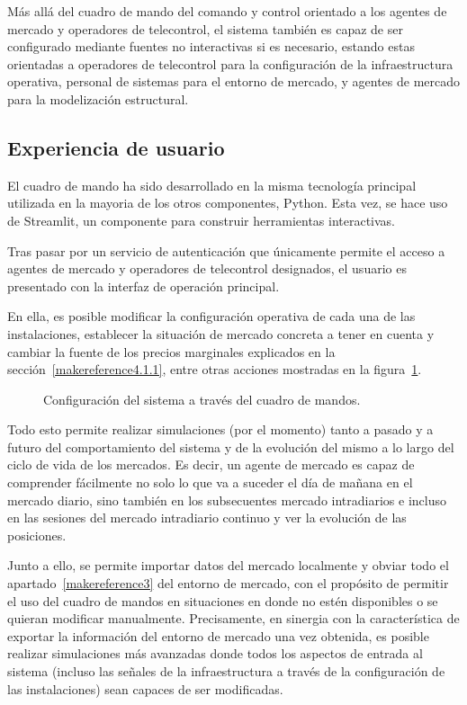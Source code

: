 Más allá del cuadro de mando del comando y control orientado a los agentes de mercado y operadores de telecontrol, el sistema también es capaz de ser configurado mediante fuentes no interactivas si es necesario, estando estas orientadas a operadores de telecontrol para la configuración de la infraestructura operativa, personal de sistemas para el entorno de mercado, y agentes de mercado para la modelización estructural.

\subsection{Experiencia de usuario}
\label{makereference6.2.1}

El cuadro de mando ha sido desarrollado en la misma tecnología principal utilizada en la mayoria de los otros componentes, Python. Esta vez, se hace uso de Streamlit, un componente para construir herramientas interactivas.

Tras pasar por un servicio de autenticación que únicamente permite el acceso a agentes de mercado y operadores de telecontrol designados, el usuario es presentado con la interfaz de operación principal.

En ella, es posible modificar la configuración operativa de cada una de las instalaciones, establecer la situación de mercado concreta a tener en cuenta y cambiar la fuente de los precios marginales explicados en la sección~\ref{makereference4.1.1}, entre otras acciones mostradas en la figura~\ref{fig:configuración-sistema}.

\begin{figure}
  \centering
  \caption{Configuración del sistema a través del cuadro de mandos.}
  \label{fig:configuración-sistema}
\end{figure}

Todo esto permite realizar simulaciones (por el momento) tanto a pasado y a futuro del comportamiento del sistema y de la evolución del mismo a lo largo del ciclo de vida de los mercados. Es decir, un agente de mercado es capaz de comprender fácilmente no solo lo que va a suceder el día de mañana en el mercado diario, sino también en los subsecuentes mercado intradiarios e incluso en las sesiones del mercado intradiario continuo y ver la evolución de las posiciones.

Junto a ello, se permite importar datos del mercado localmente y obviar todo el apartado~\ref{makereference3} del entorno de mercado, con el propósito de permitir el uso del cuadro de mandos en situaciones en donde no estén disponibles o se quieran modificar manualmente. Precisamente, en sinergia con la característica de exportar la información del entorno de mercado una vez obtenida, es posible realizar simulaciones más avanzadas donde todos los aspectos de entrada al sistema (incluso las señales de la infraestructura a través de la configuración de las instalaciones) sean capaces de ser modificadas.

